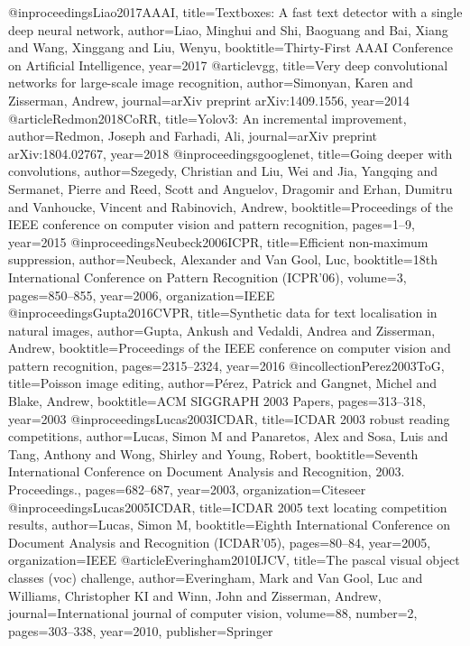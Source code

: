 @inproceedings{Liao2017AAAI,
  title={Textboxes: A fast text detector with a single deep neural network},
  author={Liao, Minghui and Shi, Baoguang and Bai, Xiang and Wang, Xinggang and Liu, Wenyu},
  booktitle={Thirty-First AAAI Conference on Artificial Intelligence},
  year={2017}
}
@article{vgg,
  title={Very deep convolutional networks for large-scale image recognition},
  author={Simonyan, Karen and Zisserman, Andrew},
  journal={arXiv preprint arXiv:1409.1556},
  year={2014}
}
@article{Redmon2018CoRR,
  title={Yolov3: An incremental improvement},
  author={Redmon, Joseph and Farhadi, Ali},
  journal={arXiv preprint arXiv:1804.02767},
  year={2018}
}
@inproceedings{googlenet,
  title={Going deeper with convolutions},
  author={Szegedy, Christian and Liu, Wei and Jia, Yangqing and Sermanet, Pierre and Reed, Scott and Anguelov, Dragomir and Erhan, Dumitru and Vanhoucke, Vincent and Rabinovich, Andrew},
  booktitle={Proceedings of the IEEE conference on computer vision and pattern recognition},
  pages={1--9},
  year={2015}
}
@inproceedings{Neubeck2006ICPR,
  title={Efficient non-maximum suppression},
  author={Neubeck, Alexander and Van Gool, Luc},
  booktitle={18th International Conference on Pattern Recognition (ICPR'06)},
  volume={3},
  pages={850--855},
  year={2006},
  organization={IEEE}
}
@inproceedings{Gupta2016CVPR,
  title={Synthetic data for text localisation in natural images},
  author={Gupta, Ankush and Vedaldi, Andrea and Zisserman, Andrew},
  booktitle={Proceedings of the IEEE conference on computer vision and pattern recognition},
  pages={2315--2324},
  year={2016}
}
@incollection{Perez2003ToG,
  title={Poisson image editing},
  author={P{\'e}rez, Patrick and Gangnet, Michel and Blake, Andrew},
  booktitle={ACM SIGGRAPH 2003 Papers},
  pages={313--318},
  year={2003}
}
@inproceedings{Lucas2003ICDAR,
  title={ICDAR 2003 robust reading competitions},
  author={Lucas, Simon M and Panaretos, Alex and Sosa, Luis and Tang, Anthony and Wong, Shirley and Young, Robert},
  booktitle={Seventh International Conference on Document Analysis and Recognition, 2003. Proceedings.},
  pages={682--687},
  year={2003},
  organization={Citeseer}
}
@inproceedings{Lucas2005ICDAR,
  title={ICDAR 2005 text locating competition results},
  author={Lucas, Simon M},
  booktitle={Eighth International Conference on Document Analysis and Recognition (ICDAR'05)},
  pages={80--84},
  year={2005},
  organization={IEEE}
}
@article{Everingham2010IJCV,
  title={The pascal visual object classes (voc) challenge},
  author={Everingham, Mark and Van Gool, Luc and Williams, Christopher KI and Winn, John and Zisserman, Andrew},
  journal={International journal of computer vision},
  volume={88},
  number={2},
  pages={303--338},
  year={2010},
  publisher={Springer}
}
